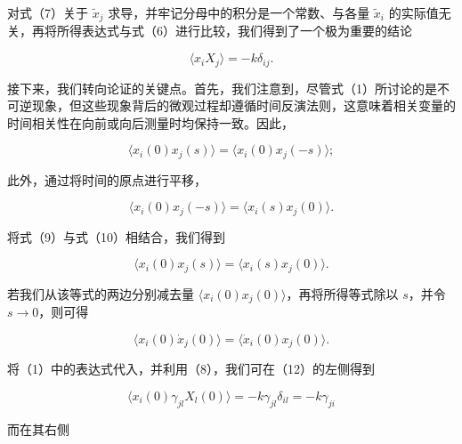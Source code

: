 对式（7）关于 \(\tilde{x}_{j}\) 求导，并牢记分母中的积分是一个常数、与各量 \(\tilde{x}_{i}\) 的实际值无关，再将所得表达式与式（6）进行比较，我们得到了一个极为重要的结论

\begin{equation}\tag{15.6.34}\label{eq:15.6.34}
\langle x _ { i } X _ { j } \rangle = - k \delta _ { i j } .
\end{equation}

接下来，我们转向论证的关键点。首先，我们注意到，尽管式（1）所讨论的是不可逆现象，但这些现象背后的微观过程却遵循时间反演法则，这意味着相关变量的时间相关性在向前或向后测量时均保持一致。因此，

\begin{equation}\tag{15.6.35}\label{eq:15.6.35}
\langle x _ { i } ( 0 ) x _ { j } ( s ) \rangle = \langle x _ { i } ( 0 ) x _ { j } ( - s ) \rangle ;
\end{equation}

此外，通过将时间的原点进行平移，

\begin{equation}\tag{15.6.36}\label{eq:15.6.36}
\langle x _ { i } ( 0 ) x _ { j } ( - s ) \rangle = \langle x _ { i } ( s ) x _ { j } ( 0 ) \rangle .
\end{equation}

将式（9）与式（10）相结合，我们得到

\begin{equation}\tag{15.6.37}\label{eq:15.6.37}
\langle x _ { i } ( 0 ) x _ { j } ( s ) \rangle = \langle x _ { i } ( s ) x _ { j } ( 0 ) \rangle .
\end{equation}

若我们从该等式的两边分别减去量 \(\langle x_{i}(0)x_{j}(0)\rangle\)，再将所得等式除以 \(s\)，并令 \(s \to 0\)，则可得

\begin{equation}\tag{15.6.38}\label{eq:15.6.38}
\langle x _ { i } ( 0 ) \dot { x } _ { j } ( 0 ) \rangle = \langle \dot { x } _ { i } ( 0 ) x _ { j } ( 0 ) \rangle .
\end{equation}

将（1）中的表达式代入，并利用（8），我们可在（12）的左侧得到

\begin{equation}\tag{15.6.39}\label{eq:15.6.39}
\langle x _ { i } ( 0 ) \gamma _ { j l } X _ { l } ( 0 ) \rangle = - k \gamma _ { j l } \delta _ { i l } = - k \gamma _ { j i }
\end{equation}

而在其右侧


